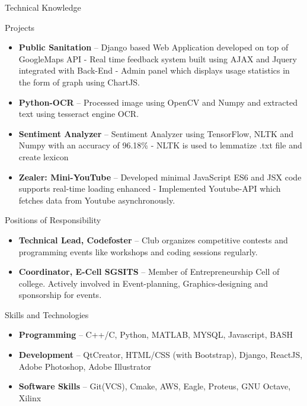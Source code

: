 \documentclass[]{mcdowellcv}
\begin{document}
	\begin{cvsection}{Technical Knowledge}{}{}\\     \begin{cvsubsection}{Projects}{}{}
			\begin{itemize}
			    
			    \item \textbf{Public Sanitation} -- Django based Web Application developed on top of GoogleMaps API - Real time feedback system built using AJAX and Jquery integrated with Back-End - Admin panel which displays usage statistics in the form of graph using ChartJS.
			    
				\item \textbf{Python-OCR} -- Processed image using OpenCV and Numpy and extracted text using tesseract engine OCR.
				
	    		\item \textbf{Sentiment Analyzer} -- Sentiment Analyzer using TensorFlow, NLTK and Numpy with an accuracy of 96.18\% - NLTK is used to lemmatize .txt file and create lexicon 
			    
			    \item \textbf{Zealer: Mini-YouTube} -- Developed minimal JavaScript ES6 and JSX code supports real-time loading enhanced - Implemented Youtube-API which fetches data from Youtube asynchronously.
			    
			\end{itemize}
		\end{cvsubsection}
	\end{cvsection}
	
	\begin{cvsection}{Positions of Responsibility}
		\begin{cvsubsection}{}{}{}	
			\begin{itemize}
				\item \textbf{Technical Lead, Codefoster} -- Club organizes competitive contests and programming events like workshops and coding sessions regularly.
			    \item \textbf{Coordinator, E-Cell SGSITS} -- Member of Entrepreneurship Cell of college. Actively involved in Event-planning, Graphics-designing and sponsorship for events.
			\end{itemize}
		\end{cvsubsection}
	\end{cvsection}
	
	\begin{cvsection}{Skills and Technologies}
		\begin{cvsubsection}{}{}{}	
			\begin{itemize}
				\item \textbf{Programming} -- C++/C, Python, MATLAB, MYSQL, Javascript, BASH
				\item \textbf{Development} -- QtCreator, HTML/CSS (with Bootstrap), Django, ReactJS, Adobe Photoshop, Adobe Illustrator
			    \item \textbf{Software Skills} -- Git(VCS), Cmake, AWS, Eagle, Proteus, GNU Octave, Xilinx
			\end{itemize}
		\end{cvsubsection}
	\end{cvsection}
	
\end{document}
